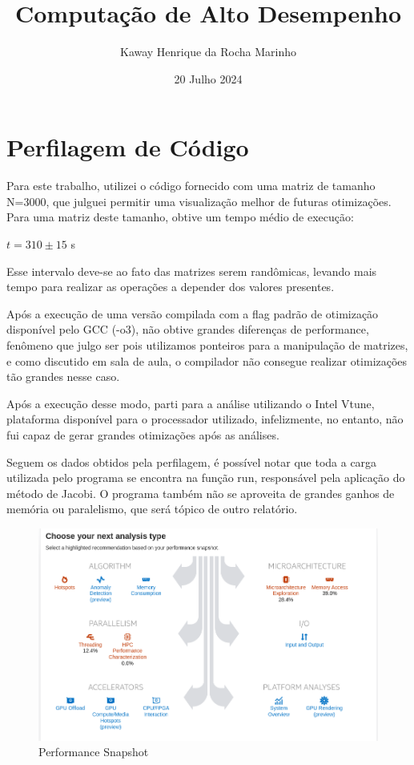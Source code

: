 \documentclass{article}
\title{Computação de Alto Desempenho}
\author{Kaway Henrique da Rocha Marinho }
\date{20 Julho 2024}
\begin{document}
\maketitle

\section{Perfilagem de Código}

Para este trabalho, utilizei o código fornecido com uma matriz de tamanho N=3000, que julguei permitir uma visualização melhor de futuras otimizações. Para uma matriz deste tamanho, obtive um tempo médio de execução:

\begin{center}
${t = 310 \pm 15}$ s
\end{center}

Esse intervalo deve-se ao fato das matrizes serem randômicas, levando mais tempo para realizar as operações a depender dos valores presentes.

Após a execução de uma versão compilada com a flag padrão de otimização disponível pelo GCC (-o3), não obtive grandes diferenças de performance, fenômeno que julgo ser pois utilizamos ponteiros para a manipulação de matrizes, e como discutido em sala de aula, o compilador não consegue realizar otimizações tão grandes nesse caso.

Após a execução desse modo, parti para a análise utilizando o Intel Vtune, plataforma disponível para o processador utilizado, infelizmente, no entanto, não fui capaz de gerar grandes otimizações após as análises. 

Seguem os dados obtidos pela perfilagem, é possível notar que toda a carga utilizada pelo programa se encontra na função run, responsável pela aplicação do método de Jacobi. O programa também não se aproveita de grandes ganhos de memória ou paralelismo, que será tópico de outro relatório.

\begin{figure}
    \centering
    \includegraphics[width=1\textwidth]{img/ps.png}
    \caption{Performance Snapshot}
    \label{fig:enter-label}
\end{figure}
\end{document}

